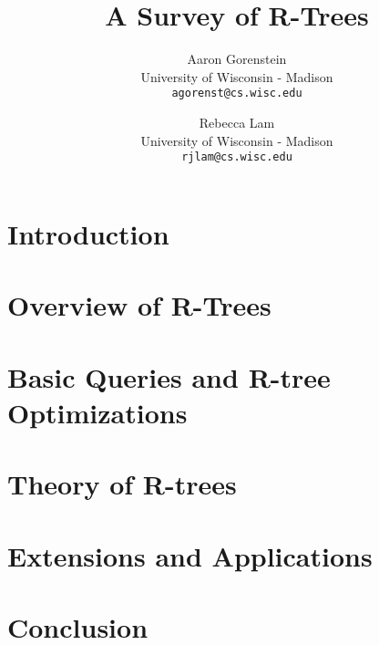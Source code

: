 \documentclass[10pt, twocolumn]{article}
\title{A Survey of R-Trees}
\author{
	Aaron Gorenstein\\
	University of Wisconsin - Madison\\
	\texttt{agorenst@cs.wisc.edu}
	\and
	Rebecca Lam\\
	University of Wisconsin - Madison\\
	\texttt{rjlam@cs.wisc.edu}
}
\begin{document}
\maketitle
\thispagestyle{empty}



\section{Introduction}
\label{sec:intro}


\section{Overview of R-Trees}
\label{sec:overview}


\section{Basic Queries and R-tree Optimizations}
\label{sec:impchal}


\section{Theory of R-trees}
\label{sec:dbchal}


\section{Extensions and Applications}
\label{sec:apps}


\section{Conclusion}
\label{sec:conc}




\end{document}
